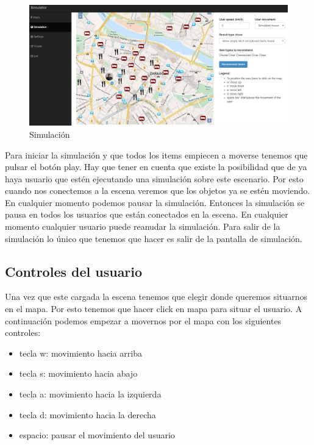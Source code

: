 \begin{figure}[H]
	\centering\includegraphics[scale=0.25]{imagenes/capitulo11/capitulo11.jpg}
	\caption{Simulación}
	\label{img:Simulation}
\end{figure}

Para iniciar la simulación y que todos los items empiecen a moverse tenemos que pulsar el botón play. Hay que tener en cuenta que existe la posibilidad que de ya haya usuario que estén ejecutando una simulación sobre este escenario. Por esto cuando nos conectemos a la escena veremos que los objetos ya se estén moviendo. En cualquier momento podemos pausar la simulación. Entonces la simulación se pausa en todos los usuarios que están conectados en la escena. En cualquier momento cualquier usuario puede reanudar la simulación. Para salir de la simulación lo único que tenemos que hacer es salir de la pantalla de simulación.

\subsection{Controles del usuario}

Una vez que este cargada la escena tenemos que elegir donde queremos situarnos en el mapa. Por esto tenemos que hacer click en mapa para situar el usuario. A continuación podemos empezar a movernos por el mapa con los siguientes controles:

\begin{itemize}
	\item tecla w: movimiento hacia arriba
	\item tecla s: movimiento hacia abajo
	\item tecla a: movimiento hacia la izquierda
	\item tecla d: movimiento hacia la derecha
	\item espacio: pausar el movimiento del usuario
\end{itemize}

